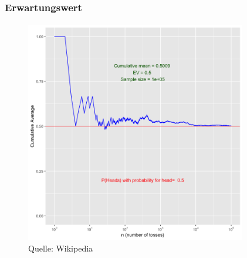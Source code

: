 \documentclass{beamer}
\begin{document}
\begin{frame}
    \frametitle{Erwartungswert}
\framesubtitle{}

\begin{figure}[htp]
      \centering
    \includegraphics[width=0.86\textwidth]{img/sgdz}
      \caption{Quelle: Wikipedia}
\end{figure}
 \end{frame}
\end{document}
